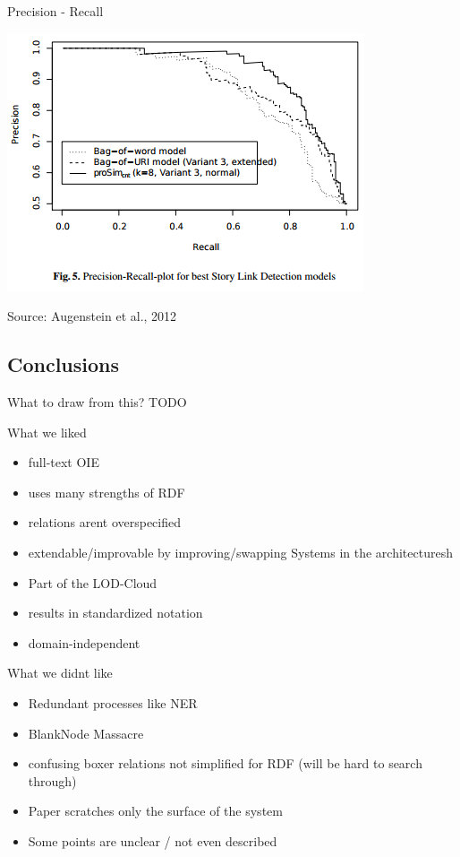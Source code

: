 \documentclass[11pt]{beamer}
\begin{document}
		\begin{frame}{Precision - Recall}
			\begin{center}
				\includegraphics[scale=1]{img/lodifierevaplot.png}
			\end{center}
			\begin{scriptsize}Source: Augenstein et al., 2012\end{scriptsize}
		\end{frame}
	\subsection{Conclusions}
		\begin{frame}{What to draw from this?}
			TODO
		\end{frame}			
		
		\begin{frame}{What we liked}
			\begin{itemize}
				\item full-text OIE
				\item uses many strengths of RDF
				\item relations arent overspecified
				\item extendable/improvable by improving/swapping Systems in the architecturesh
				\item Part of the LOD-Cloud
				\item results in standardized notation
				\item domain-independent
			\end{itemize}
		\end{frame}
		
		\begin{frame}{What we didnt like}
			\begin{itemize}
				\item Redundant processes like NER
				\item BlankNode Massacre
				\item confusing boxer relations not simplified for RDF (will be hard to search through)
				
				\vspace{15pt}
				
				\item Paper scratches only the surface of the system
				\item Some points are unclear / not even described
			\end{itemize}
		\end{frame}
\end{document}
